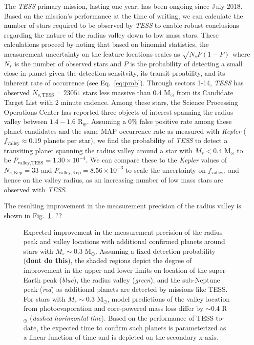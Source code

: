 \documentclass[twocolumn]{emulateapj}
\newcommand{\kepler}[1]{\emph{Kepler}#1}
\newcommand{\tess}[1]{\emph{TESS}#1}
\begin{document}
The \tess{} primary mission, lasting one year, has been ongoing since July 2018. 
Based on the mission's performance at the time of writing, we can calculate the number of stars required to be observed
by \tess{} to enable robust conclusions regarding the nature of the radius valley down to low mass stars. These calculations
proceed by noting that based on binomial statistics, the measurement uncertainty on the feature locations scales as
$\sqrt{N_sP(1-P)}$ where $N_s$ is the number of observed stars and $P$ is the probability of detecting a small close-in planet
given the detection sensitvity, its transit proability, and its inherent rate of occurrence (see Eq.~\ref{eq:prob}).
Through sectors 1-14, \tess{} has observed $N_{s,\text{TESS}} = 23051$ stars less massive than 0.4 M$_{\odot}$
from its Candidate Target List \citep[CTL;][]{stassun19} with 2 minute cadence.
Among these stars, the Science Processing Operations Center \citep[SPOC;][]{jenkins16,twicken18,li18} has reported
three objects of interest spanning the radius valley between $1.4-1.6$ R$_{\oplus}$. Assuming a 0\% false positive rate
among these planet candidates and the same MAP occurrence rate as measured with \kepler{}
($f_{\text{valley}}\approx 0.19$ planets per star), we find the probability of \tess{} to detect a transiting planet
spanning the radius valley around a star with $M_s<0.4$ M$_{\odot}$ to be 
$P_{\text{valley,TESS}}=1.30 \times 10^{-4}$. We can compare these to the \kepler{} values of $N_{s,\text{Kep}}=33$ and
$P_{\text{valley,Kep}}=8.56\times 10^{-3}$ to scale the uncertainty on $f_{\text{valley}}$, and hence on the valley radius, 
as an increasing number of low mass stars are observed with \tess{.}

The resulting improvement in the measurement precision of the radius valley is shown in Fig.~\ref{fig:improve}. ??


\begin{figure}
  \centering
  \caption{Expected improvement in the measurement precision of the radius peak and valley locations with additional
    confirmed planets around stars with $M_s\sim 0.3$ M$_{\odot}$. Assuming a fixed detection probability (\textbf{dont do this}),
    the shaded
    regions depict the degree of improvement in the upper and lower limits on location of the super-Earth peak
    (\emph{blue}), the radius valley (\emph{green}), and the sub-Neptune peak (\emph{red}) as additional planets are
    detected by missions like TESS. For stars with $M_s\sim 0.3$ M$_{\odot}$, model predictions of the valley location
    from photoevaporation and core-powered mass loss differ by $\sim 0.4$ R$_{\oplus}$ (\emph{dashed horinzontal line}).
    Based on the performance of TESS to-date, the expected time to confirm such planets is parameterized as a linear
    function of time and is depicted on the secondary x-axis.}
  \label{fig:improve}
\end{figure}
\end{document}
